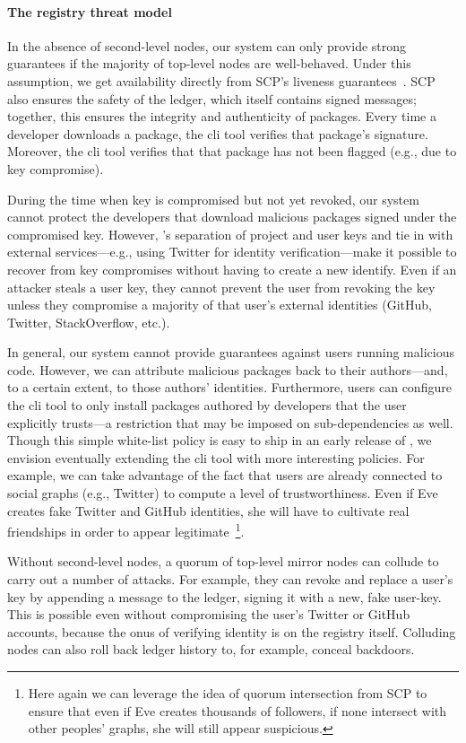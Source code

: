 \paragraph{The registry threat model}
In the absence of second-level nodes, our system can only provide strong
guarantees if the majority of top-level nodes are well-behaved. Under
this assumption, we get availability directly from SCP's liveness
guarantees~\cite{stellar}. SCP also ensures the safety of the ledger,
which itself contains signed messages; together, this ensures the integrity
and authenticity of packages.
Every time a developer downloads a package, the \spam{} cli tool verifies that
package's signature. Moreover, the \spam{} cli tool verifies that that package
has not been flagged (e.g., due to key compromise). 

During the time when key is compromised but not yet revoked, our system
cannot protect the developers that download malicious packages signed under
the compromised key. However, \spam's separation of project and user keys and
tie in with external services---e.g., using Twitter for identity
verification---make it possible to recover from key compromises without having
to create a new identify. Even if an attacker steals a user key, they cannot
prevent the user from revoking the key unless they compromise a majority of
that user's external identities (GitHub, Twitter, StackOverflow, etc.). 

In general, our system cannot provide guarantees against users running malicious
code. However, we can attribute malicious packages back to their authors---and,
to a certain extent, to those authors' identities. Furthermore, users can
configure the \spam{} cli tool to only install packages authored by developers
that the user explicitly trusts---a restriction that may be imposed on sub-dependencies
as well. Though this simple white-list policy is easy to ship in an early release of
\spam, we envision eventually extending the cli tool with more interesting policies.
For example, we can take advantage of the fact that \spam users are already
connected to social graphs (e.g., Twitter) to compute a level of trustworthiness.
Even if Eve creates fake Twitter and GitHub identities, she will have to
cultivate real friendships in order to appear legitimate~\footnote{Here again
  we can leverage the idea of quorum intersection from SCP to
  ensure that even if Eve creates thousands of followers, if none intersect
  with other peoples' graphs, she will still appear suspicious.}.

Without second-level nodes, a quorum of top-level mirror nodes can collude to carry out
a number of attacks. For example, they can revoke and replace a user's key by appending
a \replaceuserkey message to the ledger, signing it with a new, fake user-key.
This is possible even without compromising the user's Twitter or GitHub accounts,
because the onus of verifying identity is on the registry itself. Colluding
nodes can also roll back ledger history to, for example, conceal backdoors.

